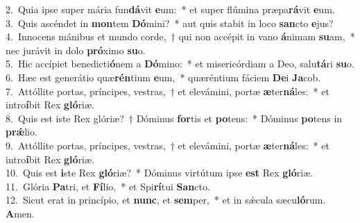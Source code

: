 {2.~}Quia ipse super mária fun\textbf{dá}vit \textbf{e}um:~* et super flúmina præpa\textbf{rá}vit \textbf{e}um.\\
{3.~}Quis ascéndet in \textbf{mon}tem \textbf{Dó}mini?~* aut quis stabit in loco \textbf{san}cto \textbf{e}jus?\\
{4.~}Innocens mánibus et mundo corde,~† qui non accépit in vano \textbf{á}nimam \textbf{su}am,~* nec jurávit in dolo \textbf{pró}ximo \textbf{su}o.\\
{5.~}Hic accípiet benedicti\textbf{ó}nem a \textbf{Dó}mino:~* et misericórdiam a Deo, salu\textbf{tá}ri \textbf{su}o.\\
{6.~}Hæc est generátio quæ\textbf{rén}tium \textbf{e}um,~* quæréntium fáciem \textbf{De}i \textbf{Ja}cob.\\
{7.~}Attóllite portas, príncipes, vestras,~† et elevámini, portæ \textbf{æ}ter\textbf{ná}les:~* et intro\textbf{í}bit Rex \textbf{gló}riæ.\\
{8.~}Quis est iste Rex glóriæ?~† Dóminus \textbf{for}tis et \textbf{po}tens:~* Dóminus \textbf{po}tens in \textbf{prǽ}lio.\\
{9.~}Attóllite portas, príncipes, vestras,~† et elevámini, portæ \textbf{æ}ter\textbf{ná}les:~* et intro\textbf{í}bit Rex \textbf{gló}riæ.\\
{10.~}Quis est \textbf{i}ste Rex \textbf{gló}riæ?~* Dóminus virtútum ipse \textbf{est} Rex \textbf{gló}riæ.\\
{11.~}Glória \textbf{Pa}tri, et \textbf{Fí}lio,~* et Spi\textbf{rí}tui \textbf{San}cto.\\
{12.~}Sicut erat in princípio, et \textbf{nunc}, et \textbf{sem}per,~* et in sǽcula sæcu\textbf{ló}rum. \textbf{A}men.\\
